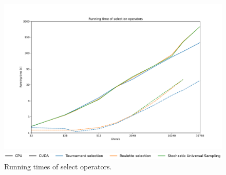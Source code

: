
\begin{figure}[ht!]
    \centering
    \begin{minipage}[t]{0.9\textwidth}
        \includegraphics[width=\textwidth]{img/runs/time_ga_selections.pdf}
    \end{minipage}

    \begin{minipage}[t]{0.9\textwidth}
        \includegraphics[width=\textwidth]{img/runs/time_ga_selections_legend.pdf}
    \end{minipage}

    \caption[Running times of select operators]{Running times of select operators. }
\end{figure}




